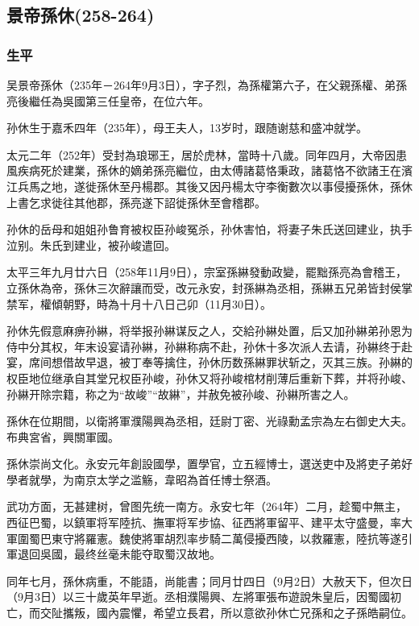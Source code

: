 
\subsection{景帝孫休\tiny(258-264)}

\subsubsection{生平}

吴景帝孫休（235年－264年9月3日），字子烈，為孫權第六子，在父親孫權、弟孫亮後繼任為吳國第三任皇帝，在位六年。

孙休生于嘉禾四年（235年），母王夫人，13岁时，跟随谢慈和盛冲就学。

太元二年（252年）受封為琅琊王，居於虎林，當時十八歲。同年四月，大帝因患風疾病死於建業，孫休的嫡弟孫亮繼位，由太傅諸葛恪秉政，諸葛恪不欲諸王在濱江兵馬之地，遂徙孫休至丹楊郡。其後又因丹楊太守李衡數次以事侵擾孫休，孫休上書乞求徙往其他郡，孫亮遂下詔徙孫休至會稽郡。

孙休的岳母和姐姐孙鲁育被权臣孙峻冤杀，孙休害怕，将妻子朱氏送回建业，执手泣别。朱氏到建业，被孙峻遣回。

太平三年九月廿六日（258年11月9日），宗室孫綝發動政變，罷黜孫亮為會稽王，立孫休為帝，孫休三次辭讓而受，改元永安，封孫綝為丞相，孫綝五兄弟皆封侯掌禁军，權傾朝野，時為十月十八日己卯（11月30日）。

孙休先假意麻痹孙綝，将举报孙綝谋反之人，交給孙綝处置，后又加孙綝弟孙恩为侍中分其权，年末设宴请孙綝，孙綝称病不赴，孙休十多次派人去请，孙綝终于赴宴，席间想借故早退，被丁奉等擒住，孙休历数孫綝罪状斩之，灭其三族。孙綝的权臣地位继承自其堂兄权臣孙峻，孙休又将孙峻棺材削薄后重新下葬，并将孙峻、孙綝开除宗籍，称之为“故峻”“故綝”，并赦免被孙峻、孙綝所害之人。

孫休在位期間，以衛將軍濮陽興為丞相，廷尉丁密、光祿勳孟宗為左右御史大夫。布典宮省，興關軍國。

孫休崇尚文化。永安元年創設國學，置學官，立五經博士，選送吏中及將吏子弟好學者就學，为南京太学之滥觞，韋昭為首任博士祭酒。

武功方面，无甚建树，曾图先统一南方。永安七年（264年）二月，趁蜀中無主，西征巴蜀，以鎮軍将军陸抗、撫軍将军步協、征西將軍留平、建平太守盛曼，率大軍圍蜀巴東守將羅憲。魏使將軍胡烈率步騎二萬侵擾西陵，以救羅憲，陸抗等遂引軍退回吳國，最终丝毫未能夺取蜀汉故地。

同年七月，孫休病重，不能語，尚能書；同月廿四日（9月2日）大赦天下，但次日（9月3日）以三十歲英年早逝。丞相濮陽興、左將軍張布遊說朱皇后，因蜀國初亡，而交阯攜叛，國內震懼，希望立長君，所以意欲孙休亡兄孫和之子孫皓嗣位。

